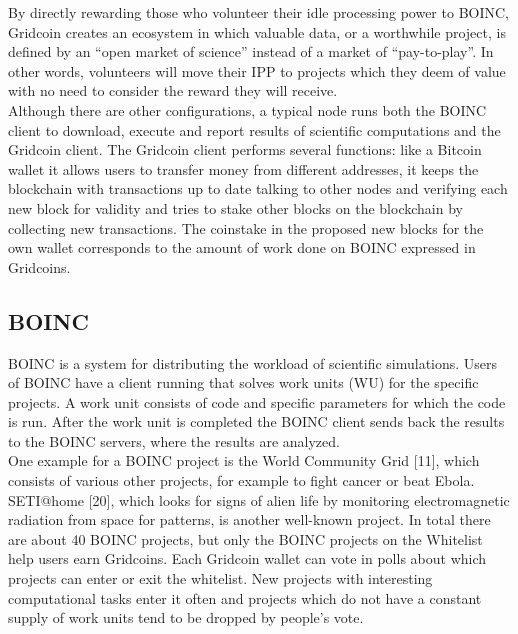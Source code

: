 By directly rewarding those who volunteer their idle processing power to BOINC, Gridcoin creates an ecosystem in which valuable data, or a worthwhile project, is defined by an “open market of science” instead of a market of “pay-to-play”.  In other words, volunteers will move their IPP to projects which they deem of value with no need to consider the reward they will receive.\\

Although there are other configurations, a typical node runs both the BOINC client to download, execute and report results of scientific computations and the Gridcoin client. The Gridcoin client performs several functions: like a Bitcoin wallet it allows users to transfer money from different addresses, it keeps the blockchain with transactions up to date talking to other nodes and verifying each new block for validity and tries to stake other blocks on the blockchain by collecting new transactions. The coinstake in the proposed new blocks for the own wallet corresponds to the amount of work done on BOINC expressed in Gridcoins.\\

\subsection{BOINC}

BOINC is a system for distributing the workload of scientific simulations. Users of BOINC have a client running that solves work units (WU) for the specific projects. A work unit consists of code and specific parameters for which the code is run.  After the work unit is completed the BOINC client sends back the results to the BOINC servers, where the results are analyzed.\\

One example for a BOINC project is the World Community Grid [11], which consists of various other projects, for example to fight cancer or beat Ebola. SETI@home [20], which looks for signs of alien life by monitoring electromagnetic radiation from space for patterns, is another well-known project.  In total there are about 40 BOINC projects, but only the BOINC projects on the Whitelist help users earn Gridcoins. Each Gridcoin wallet can vote in polls about which projects can enter or exit the whitelist. New projects with interesting computational tasks enter it often and projects which do not have a constant supply of work units tend to be dropped by people's vote. \\

